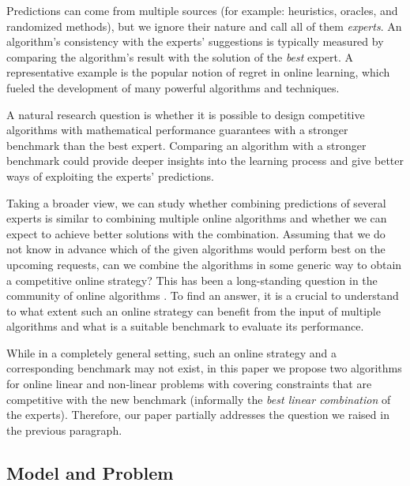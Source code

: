 Predictions can come from multiple sources (for example: heuristics, oracles, and randomized methods), but we ignore their nature and call all of them \emph{experts}.  An algorithm's consistency with the experts' suggestions is typically measured by comparing the algorithm's result with the solution of the \emph{best} expert. A representative example is the popular notion of regret in online learning, which fueled the development of many powerful algorithms and techniques.

A natural research question is whether it is possible to design competitive algorithms with mathematical performance guarantees with a stronger benchmark than the best expert. Comparing an algorithm with a stronger benchmark could provide deeper insights into the learning process and give better ways of exploiting the experts' predictions.

Taking a broader view, we can study whether combining predictions of several experts is similar to combining multiple online algorithms and whether we can expect to achieve better solutions with the combination. Assuming that we do not know in advance which of the given algorithms would perform best on the upcoming requests, can we combine the algorithms in some generic way to obtain a competitive online strategy? This has been a long-standing question in the community of online algorithms \cite{AzarBroder93:On-line-Choice,BlumBurch00:On-line-Learning}. To find an answer, it is a crucial to understand to what extent such an online strategy can benefit from the input of multiple algorithms and what is a suitable benchmark to evaluate its performance.

While in a completely general setting, such an online strategy and a corresponding benchmark may not exist, in this paper we propose
two algorithms for online linear and non-linear problems with covering constraints that are competitive with the new benchmark (informally the \emph{best linear combination} of the experts). Therefore, our paper partially addresses the question we raised in the previous paragraph.

\subsection{Model and Problem}

